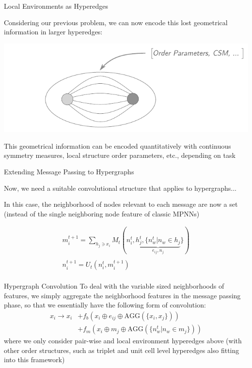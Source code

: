 \documentclass[11pt]{beamer}
\begin{document}
\begin{frame}{Local Environments as Hyperedges}


Considering our previous problem, we can now encode this lost geometrical information in larger hyperedges:

\medskip

\hspace{1cm}\includegraphics[scale=0.7]{motiflevel_ex.pdf}

\medskip

This geometrical information can be encoded quantitatively with continuous symmetry measures, local structure order parameters, etc., depending on task


\end{frame}


\begin{frame}{Extending Message Passing to Hypergraphs}

Now, we need a suitable convolutional structure that applies to hypergraphs...

\medskip

In this case, the neighborhood of nodes relevant to each message are now a set (instead of the single neighboring node feature of classic MPNNs)

\begin{gather*}
m_i^{t+1}=\sum_{h_j\ni x_i} M_t(n_i^{t},\underbrace{h_j^{t},\lbrace  n_w^t \vert n_w \in h_j }_{e_{ij},n_j}\rbrace)\\
\\
n_i^{t+1}=U_t(n_i^t,m_i^{t+1})\\
\end{gather*}
\end{frame}



\begin{frame}{Hypergraph Convolution}
To deal with the variable sized neighborhoods of features, we simply aggregate the neighborhood features in the message passing phase, so that we essentially have the following form of convolution:
\begin{align*}
x_i \rightarrow x_i &+ f_b(x_i\oplus e_{ij} \oplus \text{AGG}(\lbrace x_i, x_j\rbrace))\\
&+ f_m(x_i\oplus m_{j} \oplus \text{AGG}(\lbrace  n_w^t \vert n_w \in m_j \rbrace))
\end{align*}
where we only consider pair-wise and local environment hyperedges above (with other order structures, such as triplet and unit cell level hyperedges also fitting into this framework)

\end{frame}
\end{document}
